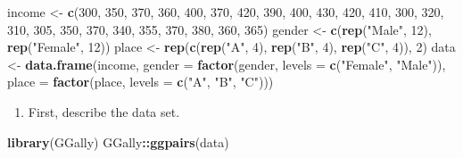 \documentclass[
]{article}
\newenvironment{Shaded}{\begin{snugshade}}{\end{snugshade}}
\newcommand{\AttributeTok}[1]{\textcolor[rgb]{0.13,0.29,0.53}{#1}}
\newcommand{\DecValTok}[1]{\textcolor[rgb]{0.00,0.00,0.81}{#1}}
\newcommand{\FunctionTok}[1]{\textcolor[rgb]{0.13,0.29,0.53}{\textbf{#1}}}
\newcommand{\NormalTok}[1]{#1}
\newcommand{\OtherTok}[1]{\textcolor[rgb]{0.56,0.35,0.01}{#1}}
\newcommand{\SpecialCharTok}[1]{\textcolor[rgb]{0.81,0.36,0.00}{\textbf{#1}}}
\newcommand{\StringTok}[1]{\textcolor[rgb]{0.31,0.60,0.02}{#1}}
\providecommand{\tightlist}{%
  \setlength{\itemsep}{0pt}\setlength{\parskip}{0pt}}
\begin{document}
\begin{Shaded}
\begin{Highlighting}[]
\NormalTok{income }\OtherTok{\textless{}{-}} \FunctionTok{c}\NormalTok{(}\DecValTok{300}\NormalTok{, }\DecValTok{350}\NormalTok{, }\DecValTok{370}\NormalTok{, }\DecValTok{360}\NormalTok{, }\DecValTok{400}\NormalTok{, }\DecValTok{370}\NormalTok{, }\DecValTok{420}\NormalTok{, }\DecValTok{390}\NormalTok{, }\DecValTok{400}\NormalTok{, }\DecValTok{430}\NormalTok{, }\DecValTok{420}\NormalTok{, }\DecValTok{410}\NormalTok{,}
    \DecValTok{300}\NormalTok{, }\DecValTok{320}\NormalTok{, }\DecValTok{310}\NormalTok{, }\DecValTok{305}\NormalTok{, }\DecValTok{350}\NormalTok{, }\DecValTok{370}\NormalTok{, }\DecValTok{340}\NormalTok{, }\DecValTok{355}\NormalTok{, }\DecValTok{370}\NormalTok{, }\DecValTok{380}\NormalTok{, }\DecValTok{360}\NormalTok{, }\DecValTok{365}\NormalTok{)}
\NormalTok{gender }\OtherTok{\textless{}{-}} \FunctionTok{c}\NormalTok{(}\FunctionTok{rep}\NormalTok{(}\StringTok{"Male"}\NormalTok{, }\DecValTok{12}\NormalTok{), }\FunctionTok{rep}\NormalTok{(}\StringTok{"Female"}\NormalTok{, }\DecValTok{12}\NormalTok{))}
\NormalTok{place }\OtherTok{\textless{}{-}} \FunctionTok{rep}\NormalTok{(}\FunctionTok{c}\NormalTok{(}\FunctionTok{rep}\NormalTok{(}\StringTok{"A"}\NormalTok{, }\DecValTok{4}\NormalTok{), }\FunctionTok{rep}\NormalTok{(}\StringTok{"B"}\NormalTok{, }\DecValTok{4}\NormalTok{), }\FunctionTok{rep}\NormalTok{(}\StringTok{"C"}\NormalTok{, }\DecValTok{4}\NormalTok{)), }\DecValTok{2}\NormalTok{)}
\NormalTok{data }\OtherTok{\textless{}{-}} \FunctionTok{data.frame}\NormalTok{(income, }\AttributeTok{gender =} \FunctionTok{factor}\NormalTok{(gender, }\AttributeTok{levels =} \FunctionTok{c}\NormalTok{(}\StringTok{"Female"}\NormalTok{,}
    \StringTok{"Male"}\NormalTok{)), }\AttributeTok{place =} \FunctionTok{factor}\NormalTok{(place, }\AttributeTok{levels =} \FunctionTok{c}\NormalTok{(}\StringTok{"A"}\NormalTok{, }\StringTok{"B"}\NormalTok{, }\StringTok{"C"}\NormalTok{)))}
\end{Highlighting}
\end{Shaded}

\begin{enumerate}
\def\labelenumi{\arabic{enumi}.}
\tightlist
\item
  First, describe the data set.
\end{enumerate}

\begin{Shaded}
\begin{Highlighting}[]
\FunctionTok{library}\NormalTok{(GGally)}
\NormalTok{GGally}\SpecialCharTok{::}\FunctionTok{ggpairs}\NormalTok{(data)}
\end{Highlighting}
\end{Shaded}
\end{document}

